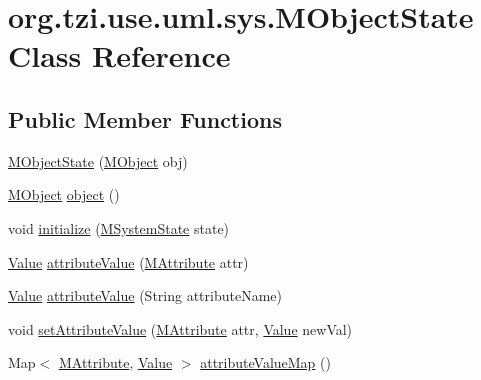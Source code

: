 \hypertarget{classorg_1_1tzi_1_1use_1_1uml_1_1sys_1_1_m_object_state}{\section{org.\-tzi.\-use.\-uml.\-sys.\-M\-Object\-State Class Reference}
\label{classorg_1_1tzi_1_1use_1_1uml_1_1sys_1_1_m_object_state}
}
\subsection*{Public Member Functions}
\begin{DoxyCompactItemize}
\item 
\hyperlink{classorg_1_1tzi_1_1use_1_1uml_1_1sys_1_1_m_object_state_a70553ea41cb071cec22929597aa80bce}{M\-Object\-State} (\hyperlink{interfaceorg_1_1tzi_1_1use_1_1uml_1_1sys_1_1_m_object}{M\-Object} obj)
\item 
\hyperlink{interfaceorg_1_1tzi_1_1use_1_1uml_1_1sys_1_1_m_object}{M\-Object} \hyperlink{classorg_1_1tzi_1_1use_1_1uml_1_1sys_1_1_m_object_state_a5492a5e1f836188a3569d0c967113a34}{object} ()
\item 
void \hyperlink{classorg_1_1tzi_1_1use_1_1uml_1_1sys_1_1_m_object_state_a1860d9da527be94914bdb3ddf249a216}{initialize} (\hyperlink{classorg_1_1tzi_1_1use_1_1uml_1_1sys_1_1_m_system_state}{M\-System\-State} state)
\item 
\hyperlink{classorg_1_1tzi_1_1use_1_1uml_1_1ocl_1_1value_1_1_value}{Value} \hyperlink{classorg_1_1tzi_1_1use_1_1uml_1_1sys_1_1_m_object_state_a168662ebc5b6f901940c10f57ef1fe81}{attribute\-Value} (\hyperlink{classorg_1_1tzi_1_1use_1_1uml_1_1mm_1_1_m_attribute}{M\-Attribute} attr)
\item 
\hyperlink{classorg_1_1tzi_1_1use_1_1uml_1_1ocl_1_1value_1_1_value}{Value} \hyperlink{classorg_1_1tzi_1_1use_1_1uml_1_1sys_1_1_m_object_state_a3f1cacb4809beb38765543c499eb775d}{attribute\-Value} (String attribute\-Name)
\item 
void \hyperlink{classorg_1_1tzi_1_1use_1_1uml_1_1sys_1_1_m_object_state_a39f003c7e6682bdb430b8d6a1a112ca1}{set\-Attribute\-Value} (\hyperlink{classorg_1_1tzi_1_1use_1_1uml_1_1mm_1_1_m_attribute}{M\-Attribute} attr, \hyperlink{classorg_1_1tzi_1_1use_1_1uml_1_1ocl_1_1value_1_1_value}{Value} new\-Val)
\item 
Map$<$ \hyperlink{classorg_1_1tzi_1_1use_1_1uml_1_1mm_1_1_m_attribute}{M\-Attribute}, \hyperlink{classorg_1_1tzi_1_1use_1_1uml_1_1ocl_1_1value_1_1_value}{Value} $>$ \hyperlink{classorg_1_1tzi_1_1use_1_1uml_1_1sys_1_1_m_object_state_a654a1c7719d7cab188f5d411f58be41a}{attribute\-Value\-Map} ()

\end{DoxyCompactItemize}
